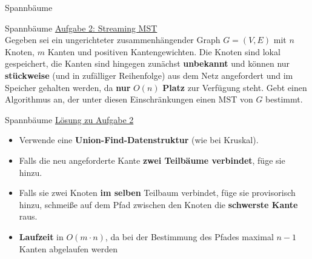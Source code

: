 \begin{frame}[t]{Spannbäume}
\end{frame}

\begin{frame}{Spannbäume}
	\underline{Aufgabe 2: Streaming MST} \\
	Gegeben sei ein ungerichteter zusammenhängender Graph $G = (V, E)$ mit $n$ Knoten, $m$ Kanten und positiven Kantengewichten. Die Knoten sind lokal gespeichert, die Kanten sind hingegen zunächst \textbf{unbekannt} und können nur \textbf{stückweise} (und in zufälliger Reihenfolge) aus dem Netz angefordert und im Speicher gehalten werden, da \textbf{nur} $O(n)$ \textbf{Platz} zur Verfügung steht. Gebt einen Algorithmus an, der unter diesen Einschränkungen einen MST von $G$ bestimmt.
\end{frame}

\begin{frame}{Spannbäume}
	\underline{Lösung zu Aufgabe 2} \\
	\begin{itemize}
		\item Verwende eine \textbf{Union-Find-Datenstruktur} (wie bei Kruskal). 
		\item Falls die neu angeforderte Kante \textbf{zwei Teilbäume verbindet}, füge sie hinzu. 
		\item Falls sie zwei Knoten \textbf{im selben} Teilbaum verbindet, füge sie provisorisch hinzu, schmeiße auf dem Pfad zwischen den Knoten die \textbf{schwerste Kante} raus. 
		\item \textbf{Laufzeit} in $O(m \cdot n)$, da bei der Bestimmung des Pfades maximal $n-1$ Kanten abgelaufen werden
	\end{itemize}
\end{frame}

